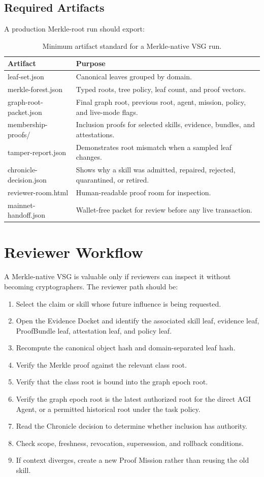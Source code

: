 \documentclass[11pt,letterpaper]{article}
\begin{document}
\subsection{Required Artifacts}
A production Merkle-root run should export:
\begin{table}[H]
\small
\centering
\begin{tabularx}{\textwidth}{>{\ttfamily}p{2.1in}Y}
\toprule
\textnormal{Artifact} & Purpose\\
\midrule
leaf-set.json & Canonical leaves grouped by domain.\\
merkle-forest.json & Typed roots, tree policy, leaf count, and proof vectors.\\
graph-root-packet.json & Final graph root, previous root, agent, mission, policy, and live-mode flags.\\
membership-proofs/ & Inclusion proofs for selected skills, evidence, bundles, and attestations.\\
tamper-report.json & Demonstrates root mismatch when a sampled leaf changes.\\
chronicle-decision.json & Shows why a skill was admitted, repaired, rejected, quarantined, or retired.\\
reviewer-room.html & Human-readable proof room for inspection.\\
mainnet-handoff.json & Wallet-free packet for review before any live transaction.\\
\bottomrule
\end{tabularx}
\caption{Minimum artifact standard for a Merkle-native VSG run.}
\end{table}


\section{Reviewer Workflow}
A Merkle-native VSG is valuable only if reviewers can inspect it without becoming cryptographers. The reviewer path should be:
\begin{enumerate}
\item Select the claim or skill whose future influence is being requested.
\item Open the Evidence Docket and identify the associated skill leaf, evidence leaf, ProofBundle leaf, attestation leaf, and policy leaf.
\item Recompute the canonical object hash and domain-separated leaf hash.
\item Verify the Merkle proof against the relevant class root.
\item Verify that the class root is bound into the graph epoch root.
\item Verify the graph epoch root is the latest authorized root for the direct AGI Agent, or a permitted historical root under the task policy.
\item Read the Chronicle decision to determine whether inclusion has authority.
\item Check scope, freshness, revocation, supersession, and rollback conditions.
\item If context diverges, create a new Proof Mission rather than reusing the old skill.
\end{enumerate}
\end{document}
